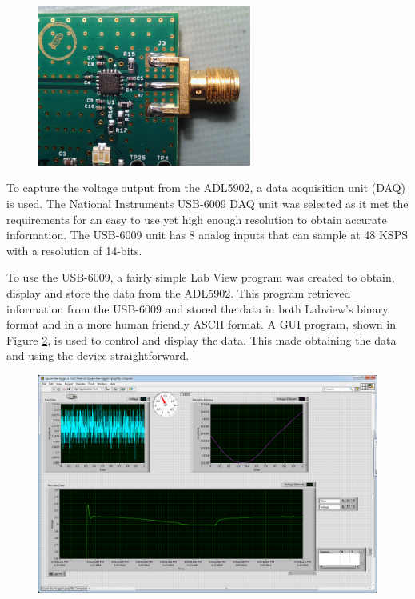 {\begin{figure}[h!tb] \centering
\includegraphics[width=7cm]{Images/adl5902.jpg}
\label{square_law}
\end{figure}
}

To capture the voltage output from the ADL5902, a data acquisition unit (DAQ) is used.  The National Instruments USB-6009 DAQ unit was selected as it met the requirements for an easy to use yet high enough resolution to obtain accurate information.  The USB-6009 unit has 8 analog inputs that can sample at 48 KSPS with a resolution of 14-bits.  

To use the USB-6009, a fairly simple Lab View program was created to obtain, display and store the data from the ADL5902.  This program retrieved information from the USB-6009 and stored the data in both Labview's binary format and in a more human friendly ASCII format.  A GUI program, shown in Figure \ref{labviewgui}, is used to control and display the data.  This made obtaining the data and using the device straightforward.

{\begin{figure}[h!tb] \centering
\includegraphics[width=\textwidth]{Images/labviewGUI.png}
\label{labviewgui}
\end{figure}
}

